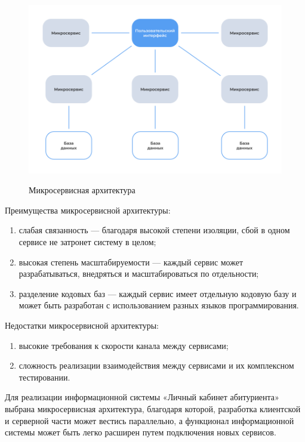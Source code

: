 \begin{figure}[H]
\begin{center}
\includegraphics[width=0.9\hsize]{fig/microservices.png}\\[2mm]
\caption{Микросервисная архитектура}\label{fig:microservices}
\end{center}
\end{figure}

Преимущества микросервисной архитектуры:

\begin{enumerate} 
  \item слабая связанность — благодаря высокой степени изоляции, сбой в одном сервисе не затронет систему в целом;
  
  \item высокая степень масштабируемости — каждый сервис может разрабатываться, внедряться и масштабироваться по отдельности;
  
  \item разделение кодовых баз — каждый сервис имеет отдельную кодовую базу и может быть разработан с использованием разных языков программирования.
\end{enumerate}

Недостатки микросервисной архитектуры:

\begin{enumerate} 
  \item высокие требования к скорости канала между сервисами;
  
  \item сложность реализации взаимодействия между сервисами и их комплексном тестировании.
\end{enumerate}

Для реализации информационной системы «Личный кабинет абитуриента» выбрана микросервисная архитектура, благодаря которой, разработка клиентской и серверной части может вестись параллельно, а функционал информационной системы может быть легко расширен путем подключения новых сервисов.

